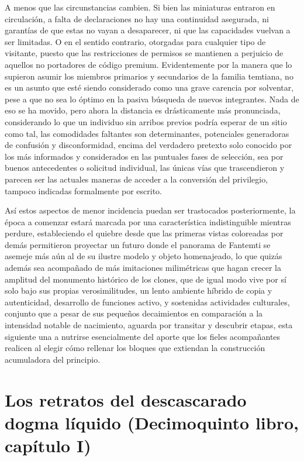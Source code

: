 \documentclass[
]{book}
\begin{document}
A menos que las circunstancias cambien. Si bien las miniaturas entraron en circulación, a falta de declaraciones no hay una continuidad asegurada, ni garantías de que estas no vayan a desaparecer, ni que las capacidades vuelvan a ser limitadas. O en el sentido contrario, otorgadas para cualquier tipo de visitante, puesto que las restricciones de permisos se mantienen a perjuicio de aquellos no portadores de código premium. Evidentemente por la manera que lo supieron asumir los miembros primarios y secundarios de la familia temtiana, no es un asunto que esté siendo considerado como una grave carencia por solventar, pese a que no sea lo óptimo en la pasiva búsqueda de nuevos integrantes. Nada de eso se ha movido, pero ahora la distancia es drásticamente más pronunciada, considerando lo que un individuo sin arribos previos podría esperar de un sitio como tal, las comodidades faltantes son determinantes, potenciales generadoras de confusión y disconformidad, encima del verdadero pretexto solo conocido por los más informados y considerados en las puntuales fases de selección, sea por buenos antecedentes o solicitud individual, las únicas vías que trascendieron y parecen ser las actuales maneras de acceder a la conversión del privilegio, tampoco indicadas formalmente por escrito.

Así estos aspectos de menor incidencia puedan ser trastocados posteriormente, la época a comenzar estará marcada por una característica indistinguible mientras perdure, estableciendo el quiebre desde que las primeras vistas coloreadas por demás permitieron proyectar un futuro donde el panorama de Fantemti se asemeje más aún al de su ilustre modelo y objeto homenajeado, lo que quizás además sea acompañado de más imitaciones milimétricas que hagan crecer la amplitud del monumento histórico de los clones, que de igual modo vive por sí solo bajo sus propias verosimilitudes, un lento ambiente híbrido de copia y autenticidad, desarrollo de funciones activo, y sostenidas actividades culturales, conjunto que a pesar de sus pequeños decaimientos en comparación a la intensidad notable de nacimiento, aguarda por transitar y descubrir etapas, esta siguiente una a nutrirse esencialmente del aporte que los fieles acompañantes realicen al elegir cómo rellenar los bloques que extiendan la construcción acumuladora del principio.

\hypertarget{los-retratos-del-descascarado-dogma-luxedquido-decimoquinto-libro-capuxedtulo-i}{%
\section{Los retratos del descascarado dogma líquido (Decimoquinto libro, capítulo I)}\label{los-retratos-del-descascarado-dogma-luxedquido-decimoquinto-libro-capuxedtulo-i}}
\end{document}
